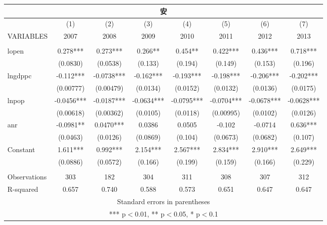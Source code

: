 \documentclass[]{article}
\begin{document}
\begin{tabular}{lccccccc}
\multicolumn{8}{c}{安} \\ \hline
 & (1) & (2) & (3) & (4) & (5) & (6) & (7) \\
VARIABLES & 2007 & 2008 & 2009 & 2010 & 2011 & 2012 & 2013 \\ \hline
 &  &  &  &  &  &  &  \\
lopen & 0.278*** & 0.273*** & 0.266** & 0.454** & 0.422*** & 0.436*** & 0.718*** \\
 & (0.0830) & (0.0538) & (0.133) & (0.194) & (0.149) & (0.153) & (0.196) \\
lngdppc & -0.112*** & -0.0738*** & -0.162*** & -0.193*** & -0.198*** & -0.206*** & -0.202*** \\
 & (0.00777) & (0.00479) & (0.0134) & (0.0152) & (0.0132) & (0.0136) & (0.0175) \\
lnpop & -0.0456*** & -0.0187*** & -0.0634*** & -0.0795*** & -0.0704*** & -0.0678*** & -0.0628*** \\
 & (0.00618) & (0.00362) & (0.0105) & (0.0118) & (0.00995) & (0.0102) & (0.0126) \\
anr & -0.0981** & 0.0470*** & 0.0386 & 0.0505 & -0.102 & -0.0714 & 0.636*** \\
 & (0.0463) & (0.0126) & (0.0869) & (0.104) & (0.0673) & (0.0682) & (0.107) \\
Constant & 1.611*** & 0.992*** & 2.154*** & 2.567*** & 2.834*** & 2.910*** & 2.649*** \\
 & (0.0886) & (0.0572) & (0.166) & (0.199) & (0.159) & (0.166) & (0.229) \\
 &  &  &  &  &  &  &  \\
Observations & 303 & 182 & 304 & 311 & 308 & 307 & 312 \\
 R-squared & 0.657 & 0.740 & 0.588 & 0.573 & 0.651 & 0.647 & 0.647 \\ \hline
\multicolumn{8}{c}{ Standard errors in parentheses} \\
\multicolumn{8}{c}{ *** p$<$0.01, ** p$<$0.05, * p$<$0.1} \\
\end{tabular}
\end{document}
